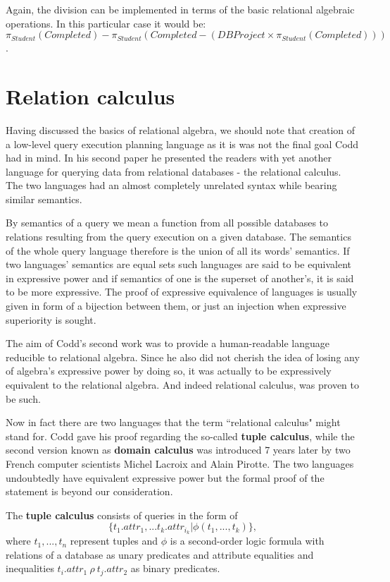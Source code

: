\documentclass[12pt]{article}
\begin{document}
Again, the division can be implemented in terms of the basic relational algebraic operations.
In this particular case it would be: $$\pi_{Student}(Completed) - \pi_{Student}(Completed -
(DBProject \times \pi_{Student}(Completed)))$$.

\section{Relation calculus}

Having discussed the basics of relational algebra, we should note that
creation of a low-level query execution planning language as it is
was not the final goal Codd had in mind. In his second paper he presented the readers with yet
another language for querying data from relational databases - the relational calculus.
The two languages had an almost completely unrelated syntax while bearing similar semantics.

By semantics of a query we mean a function from all possible databases to relations resulting
from the query execution on a given database. The semantics of the whole query language therefore
is the union of all its words' semantics. If two languages' semantics are equal sets such languages
are said to be equivalent in expressive power and if semantics of one is the superset of another's,
it is said to be more expressive. The proof of expressive equivalence of languages is usually given in form of
a bijection between them, or just an injection when expressive superiority is sought.

The aim of Codd's second work was to provide a human-readable language reducible to relational
algebra. Since he also did not cherish the idea of losing any of algebra's expressive power
by doing so, it was actually to be expressively equivalent to the relational algebra.
And indeed relational calculus, was proven to be such.

Now in fact there are two languages that the term ``relational calculus" might stand for. Codd gave his proof
regarding the so-called \textbf{tuple calculus}, while the second version known as \textbf{domain calculus}
was introduced 7 years later by two French computer scientists Michel Lacroix and Alain Pirotte.
The two languages undoubtedly have equivalent expressive power but the formal proof of the statement is
beyond our consideration.

The \textbf{tuple calculus} consists of queries in the form of
$$\{t_1.attr_1, ... t_k.attr_{i_k} | \phi(t_1, ..., t_k)\},$$
where $t_1, ..., t_n$ represent tuples
and $\phi$ is a second-order logic formula with relations of a database as unary predicates and
attribute equalities and inequalities $t_i.attr_1\ \rho\ t_j.attr_2$ as binary predicates.
\end{document}
